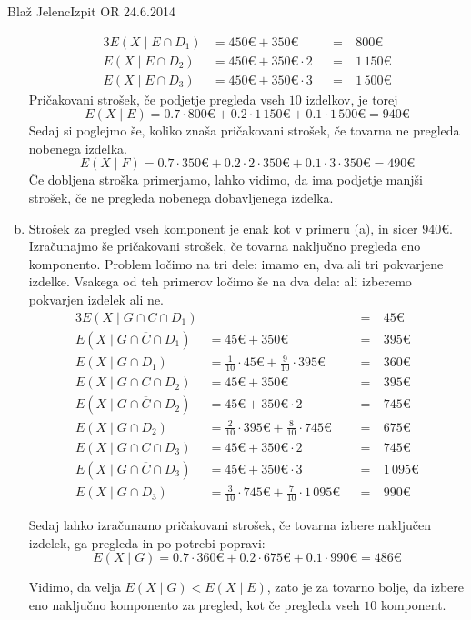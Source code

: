 \begin{naloga}{Blaž Jelenc}{Izpit OR 24.6.2014}
\begin{odgovor}
\begin{enumerate}[(a)]
\needspace{\baselineskip}
\begin{alignat*}{3}
E(X \mid E \cap D_1) &= 450 € + 350 € &&=&\ 800 € \\
E(X \mid E \cap D_2) &= 450 € + 350 € \cdot 2 &&=&\ 1\,150 € \\
E(X \mid E \cap D_3) &= 450 € + 350 € \cdot 3 &&=&\ 1\,500 €
\end{alignat*}
Pričakovani strošek, če podjetje pregleda vseh $10$ izdelkov, je torej
$$
E(X \mid E) = 0.7 \cdot 800 € + 0.2 \cdot 1\,150 € + 0.1 \cdot 1\,500 € = 940 €
$$
Sedaj si poglejmo še, koliko znaša pričakovani strošek,
če tovarna ne pregleda nobenega izdelka.
$$
E(X \mid F) = 0.7 \cdot 350 € + 0.2 \cdot 2 \cdot 350 € + 0.1 \cdot 3 \cdot 350 € = 490 €
$$
Če dobljena stroška primerjamo, lahko vidimo,
da ima podjetje manjši strošek, če ne pregleda nobenega dobavljenega izdelka.

\item Strošek za pregled vseh komponent je enak kot v primeru (a),
in sicer $940 €$.
Izračunajmo še pričakovani strošek,
če tovarna naključno pregleda eno komponento.
Problem ločimo na tri dele:
imamo en, dva ali tri pokvarjene izdelke.
Vsakega od teh primerov ločimo še na dva dela:
ali izberemo pokvarjen izdelek ali ne.
\begin{alignat*}{3}
E(X \mid G \cap C \cap D_1) &&&=&\ 45 € \\
E(X \mid G \cap \overline{C} \cap D_1) &= 45 € + 350 € &&=&\ 395 € \\
E(X \mid G \cap D_1) &= \frac{1}{10} \cdot 45 € + \frac{9}{10} \cdot 395 €
&&=&\ 360 € \\[1ex]
E(X \mid G \cap C \cap D_2) &= 45 € + 350 € &&=&\ 395 € \\
E(X \mid G \cap \overline{C} \cap D_2) &= 45 € + 350 € \cdot 2 &&=&\ 745 € \\
E(X \mid G \cap D_2) &= \frac{2}{10} \cdot 395 € + \frac{8}{10} \cdot 745 €
&&=&\ 675 € \\[1ex]
E(X \mid G \cap C \cap D_3) &= 45 € + 350 € \cdot 2 &&=&\ 745 € \\
E(X \mid G \cap \overline{C} \cap D_3) &= 45 € + 350 € \cdot 3 &&=&\ 1\,095 € \\
E(X \mid G \cap D_3) &= \frac{3}{10} \cdot 745 € + \frac{7}{10} \cdot 1\,095 €
&&=&\ 990 €
\end{alignat*}

Sedaj lahko izračunamo pričakovani strošek,
če tovarna izbere naključen izdelek,
ga pregleda in po potrebi popravi:
$$
E(X \mid G) = 0.7 \cdot 360 € + 0.2 \cdot 675 € + 0.1 \cdot 990 € = 486 €
$$

Vidimo, da velja $E(X \mid G) < E(X \mid E)$,
zato je za tovarno bolje, da izbere eno naključno komponento za pregled,
kot če pregleda vseh $10$ komponent.
\end{enumerate}
\end{odgovor}
\end{naloga}
